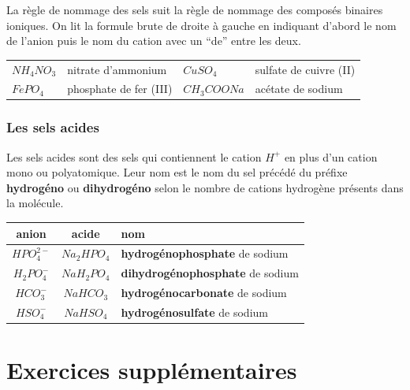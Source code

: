 \documentclass[
  11pt,
  a4paper,
  openany]{book}
\begin{document}
La règle de nommage des sels suit la règle de nommage des composés binaires ioniques. On lit la formule brute de droite à gauche en indiquant d'abord le nom de l'anion puis le nom du cation avec un ``de'' entre les deux.

\begin{longtable}[]{@{}
  >{\centering\arraybackslash}p{}
  >{\raggedright\arraybackslash}p{}
  >{\centering\arraybackslash}p{}
  >{\raggedright\arraybackslash}p{}@{}}
\toprule()
\endhead
\(NH_4NO_3\) & nitrate d'ammonium & \(CuSO_4\) & sulfate de cuivre (II) \\
\(FePO_4\) & phosphate de fer (III) & \(CH_3COONa\) & acétate de sodium \\
\bottomrule()
\end{longtable}

\hypertarget{les-sels-acides}{%
\subsubsection{Les sels acides}\label{les-sels-acides}}

Les sels acides sont des sels qui contiennent le cation \(H^+\) en plus d'un cation mono ou polyatomique. Leur nom est le nom du sel précédé du préfixe \textbf{hydrogéno} ou \textbf{dihydrogéno} selon le nombre de cations hydrogène présents dans la molécule.

\begin{longtable}[]{@{}ccl@{}}
\toprule()
anion & acide & nom \\
\midrule()
\endhead
\(HPO_4^{2-}\) & \(Na_2HPO_4\) & \textbf{hydrogénophosphate} de sodium \\
\(H_2PO_4^-\) & \(NaH_2PO_4\) & \textbf{dihydrogénophosphate} de sodium \\
\(HCO_3^-\) & \(NaHCO_3\) & \textbf{hydrogénocarbonate} de sodium \\
\(HSO_4^-\) & \(NaHSO_4\) & \textbf{hydrogénosulfate} de sodium \\
\bottomrule()
\end{longtable}

\hypertarget{exercices-suppluxe9mentaires-6}{%
\section{Exercices supplémentaires}\label{exercices-suppluxe9mentaires-6}}
\end{document}
